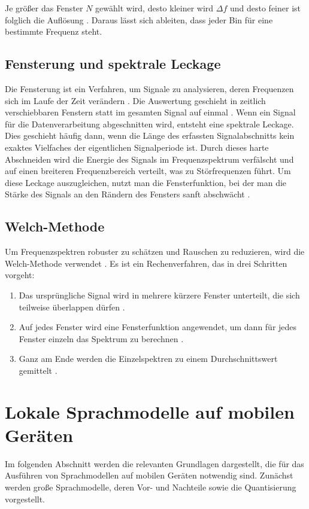 \noindent Je größer das Fenster $N$ gewählt wird, desto kleiner wird $\Delta f$ und desto feiner ist folglich die Auflösung \autocite{windowing_welch2021}. Daraus lässt sich ableiten, dass jeder Bin für eine bestimmte Frequenz steht.


\subsection{Fensterung und spektrale Leckage}
\label{subsec:fensterung}
Die Fensterung ist ein Verfahren, um Signale zu analysieren, deren Frequenzen sich im Laufe der Zeit verändern \autocite{10353995}.
Die Auswertung geschieht in zeitlich verschiebbaren Fenstern statt im gesamten Signal auf einmal \autocite{10353995}.
Wenn ein Signal für die Datenverarbeitung abgeschnitten wird, entsteht eine spektrale Leckage. Dies geschieht häufig dann, wenn die Länge des erfassten Signalabschnitts kein exaktes Vielfaches der eigentlichen Signalperiode ist.
Durch dieses harte Abschneiden wird die Energie des Signals im Frequenzspektrum verfälscht und auf einen breiteren Frequenzbereich verteilt, was zu Störfrequenzen führt.
Um diese Leckage auszugleichen, nutzt man die Fensterfunktion, bei der man die Stärke des Signals an den Rändern des Fensters sanft abschwächt \autocite{windowing_welch2021}.

\subsection{Welch-Methode}
\label{subsec:welch}
Um Frequenzspektren robuster zu schätzen und Rauschen zu reduzieren, wird die Welch-Methode verwendet \autocite{windowing_welch2021}.
Es ist ein Rechenverfahren, das in drei Schritten vorgeht:

\begin{enumerate}
    \item Das ursprüngliche Signal wird in mehrere kürzere Fenster unterteilt, die sich teilweise überlappen dürfen \autocite{windowing_welch2021}.
    \item Auf jedes Fenster wird eine Fensterfunktion angewendet, um dann für jedes Fenster einzeln das Spektrum zu berechnen \autocite{windowing_welch2021}.
    \item Ganz am Ende werden die Einzelspektren zu einem Durchschnittswert gemittelt \autocite{windowing_welch2021}.
\end{enumerate}


\section{Lokale Sprachmodelle auf mobilen Geräten}
\label{sec:llm-grundlagen}
Im folgenden Abschnitt werden die relevanten Grundlagen dargestellt, die für das
Ausführen von Sprachmodellen auf mobilen Geräten notwendig sind. Zunächst werden
große Sprachmodelle, deren Vor- und Nachteile sowie die Quantisierung vorgestellt.

